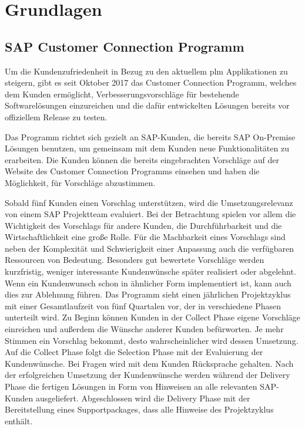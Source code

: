 \chapter{Grundlagen}

\section{SAP Customer Connection Programm}

Um die Kundenzufriedenheit in Bezug zu den aktuellem \ac{plm} Applikationen zu steigern, gibt es seit Oktober 2017 das Customer Connection Programm, welches dem Kunden ermöglicht, Verbesserungsvorschläge für bestehende Softwarelösungen einzureichen und die dafür entwickelten Lösungen bereits vor offiziellem Release zu testen.\autocite[Vgl.][]{NoteCCP2021}

Das Programm richtet sich gezielt an SAP-Kunden, die bereits SAP On-Premise Lösungen benutzen, um gemeinsam mit dem Kunden neue Funktionalitäten zu erarbeiten. \autocite[Vgl.][]{CIP2021} Die Kunden können die bereits eingebrachten Vorschläge auf der Website des Customer Connection Programms einsehen und haben die Möglichkeit, für Vorschläge abzustimmen.

Sobald fünf Kunden einen Vorschlag unterstützen, wird die Umsetzungsrelevanz von einem SAP Projektteam evaluiert. Bei der Betrachtung spielen vor allem die Wichtigkeit des Vorschlags für andere Kunden, die Durchführbarkeit und die Wirtschaftlichkeit eine große Rolle. Für die Machbarkeit eines Vorschlags sind neben der Komplexität und Schwierigkeit einer Anpassung auch die verfügbaren Ressourcen von Bedeutung. Besonders gut bewertete Vorschläge werden kurzfristig, weniger interessante Kundenwünsche später realisiert oder abgelehnt. Wenn ein Kundenwunsch schon in ähnlicher Form implementiert ist, kann auch dies zur Ablehnung führen.\autocite[Vgl.][]{CCP}
\newpage
Das Programm sieht einen jährlichen Projektzyklus mit einer Gesamtlaufzeit von fünf Quartalen vor, der in verschiedene Phasen unterteilt wird.\autocite[Vgl.][]{NoteCCP2021} Zu Beginn können Kunden in der Collect Phase eigene Vorschläge einreichen und außerdem die Wünsche anderer Kunden befürworten. Je mehr Stimmen ein Vorschlag bekommt, desto wahrscheinlicher wird dessen Umsetzung. Auf die Collect Phase folgt die Selection Phase mit der Evaluierung der Kundenwünsche. Bei Fragen wird mit dem Kunden Rücksprache gehalten. Nach der erfolgreichen Umsetzung der Kundenwünsche werden während der Delivery Phase die fertigen Lösungen in Form von Hinweisen an alle relevanten SAP-Kunden ausgeliefert. Abgeschlossen wird die Delivery Phase mit der Bereitstellung eines Supportpackages, dass alle Hinweise des Projektzyklus enthält.\autocite[Vgl.][]{CCP}

